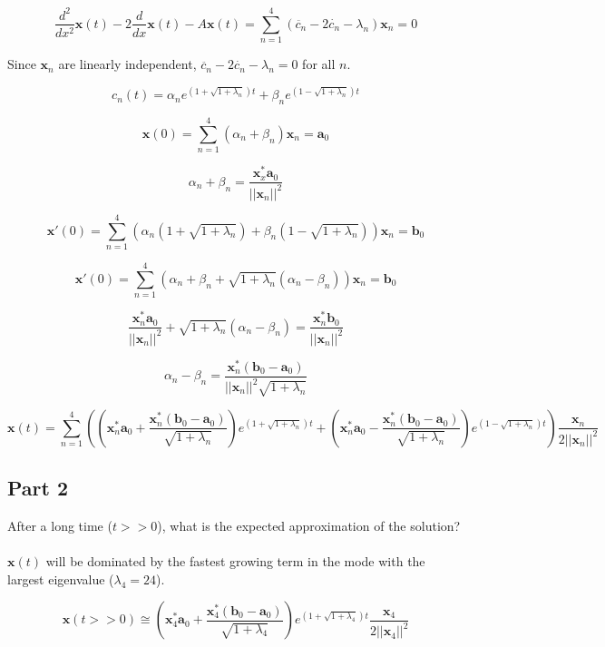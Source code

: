 \documentclass{amsart}
\begin{document}
	\[\frac{d^2}{dx^2}\mathbf{x}(t) - 2\frac{d}{dx}\mathbf{x}(t) - A\mathbf{x}(t) = 
	\sum_{n=1}^{4}\left( \ddot{c_n} - 2\dot{c_n}- \lambda_n \right) \mathbf{x}_n = 0\]
	
	Since $\mathbf{x}_n$ are linearly independent, $\ddot{c_n} - 2\dot{c_n}- \lambda_n = 0$ for all $n$.
	
	\[ c_n(t) = \alpha_n e^{(1+\sqrt{1+\lambda_n})t} + 
	            \beta_n e^{(1-\sqrt{1+\lambda_n})t} \]
	
	\[ \mathbf{x}(0) = \sum_{n=1}^{4} (\alpha_n + \beta_n)\mathbf{x}_n = \mathbf{a}_0\]
	
	\[ \alpha_n + \beta_n = \frac{\mathbf{x}_x^* \mathbf{a}_0}{||\mathbf{x}_n||^2}\]
	
	\[ \mathbf{x}'(0) = \sum_{n=1}^{4} \left( \alpha_n(1+\sqrt{1+\lambda_n}) + \beta_n(1-\sqrt{1+\lambda_n}) \right)\mathbf{x}_n = \mathbf{b}_0 \]
	
	\[ \mathbf{x}'(0) = \sum_{n=1}^{4}\left( \alpha_n + \beta_n + \sqrt{1+\lambda_n}(\alpha_n - \beta_n) \right) \mathbf{x}_n = \mathbf{b}_0 \]
	
	\[ \frac{\mathbf{x}_n^* \mathbf{a}_0}{||\mathbf{x}_n||^2} + \sqrt{1+\lambda_n}(\alpha_n - \beta_n) = \frac{\mathbf{x}_n^* \mathbf{b}_0}{||\mathbf{x}_n||^2} \]
	
	\[ \alpha_n - \beta_n = \frac{\mathbf{x}_n^* (\mathbf{b}_0 - \mathbf{a}_0)}{||\mathbf{x}_n||^2 \sqrt{1+\lambda_n}}\]
	
	\[ \mathbf{x}(t) = \sum_{n=1}^{4} \left( \left(\mathbf{x}_n^*\mathbf{a}_0 + \frac{\mathbf{x}_n^*(\mathbf{b}_0 - \mathbf{a}_0)}{\sqrt{1+\lambda_n}} \right)e^{(1+\sqrt{1+\lambda_n})t} +
	\left(\mathbf{x}_n^*\mathbf{a}_0 - \frac{\mathbf{x}_n^*(\mathbf{b}_0 - \mathbf{a}_0)}{\sqrt{1+\lambda_n}} \right)e^{(1-\sqrt{1+\lambda_n})t}
	\right) \frac{\mathbf{x}_n}{2||\mathbf{x}_n||^2} \]
	
	\subsection{Part 2}
	After a long time ($t >> 0$), what is the expected approximation of the solution?
	\\\\
	$\mathbf{x}(t)$ will be dominated by the fastest growing term in the mode with the largest eigenvalue ($\lambda_4 = 24$).
	
	\[ \mathbf{x}(t>>0) \cong \left( \mathbf{x}_4^* \mathbf{a}_0 + \frac{\mathbf{x}_4^* (\mathbf{b}_0 - \mathbf{a}_0)}{\sqrt{1+\lambda_4}}\right) e^{(1+\sqrt{1+\lambda_4})t} \frac{\mathbf{x}_4}{2||\mathbf{x}_4||^2} \]
	
\end{document}
